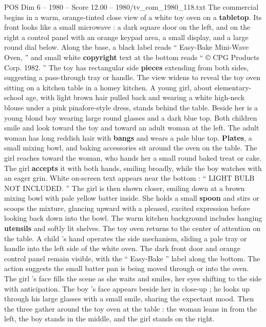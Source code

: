 \begin{textsample}{POS Dim 6 – 1980 – Score 12.00 – 1980/tv\_com\_1980\_118.txt}  \label{ex:f6_pos_035}
The commercial begins in a warm, orange-tinted close view of a white toy oven on a \textbf{tabletop}.
Its front looks like a small microwave : a dark square door on the left, and on the right a control panel with an orange keypad area, a small display, and a large round dial below.
Along the base, a black label reads “ Easy-Bake Mini-Wave Oven, ” and small white \textbf{copyright} text at the bottom reads “ {\EmojiFont ©} CPG Products Corp. 1982. ” The toy has rectangular side \textbf{pieces} extending from both sides, suggesting a pass-through tray or handle.
The view widens to reveal the toy oven sitting on a kitchen table in a homey kitchen.
A young girl, about elementary-school age, with light brown hair pulled back and wearing a white high-neck blouse under a pink pinafore-style dress, stands behind the table.
Beside her is a young blond boy wearing large round glasses and a dark blue top.
Both children smile and look toward the toy and toward an adult woman at the left.
The adult woman has long reddish hair with \textbf{bangs} and wears a pale blue top. \textbf{Plates}, a small mixing bowl, and baking accessories sit around the oven on the table.
The girl reaches toward the woman, who hands her a small round baked treat or cake.
The girl \textbf{accepts} it with both hands, smiling broadly, while the boy watches with an eager grin.
White on-screen text appears near the bottom : “ LIGHT BULB NOT INCLUDED. ” The girl is then shown closer, smiling down at a brown mixing bowl with pale yellow batter inside.
She holds a small \textbf{spoon} and stirs or scoops the mixture, glancing upward with a pleased, excited expression before looking back down into the bowl.
The warm kitchen background includes hanging \textbf{utensils} and softly lit shelves.
The toy oven returns to the center of attention on the table.
A child ’s hand operates the side mechanism, sliding a pale tray or handle into the left side of the white oven.
The dark front door and orange control panel remain visible, with the “ Easy-Bake ” label along the bottom.
The action suggests the small batter pan is being moved through or into the oven.
The girl ’s face fills the scene as she waits and smiles, her eyes shifting to the side with anticipation.
The boy ’s face appears beside her in close-up ; he looks up through his large glasses with a small smile, sharing the expectant mood.
Then the three gather around the toy oven at the table : the woman leans in from the left, the boy stands in the middle, and the girl stands on the right.

\end{textsample}
